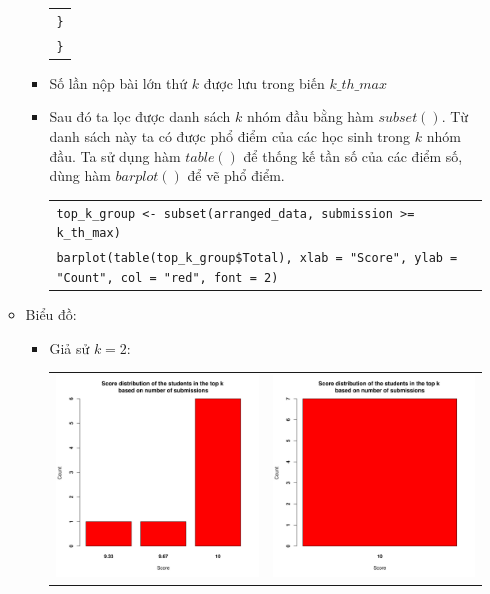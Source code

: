 \documentclass[a4paper]{article}
\theoremstyle{definition}
\begin{document}
\begin{enumerate}[a)]
\begin{itemize}
\begin{itemize}
\begin{center}
\begin{tabular}{p{13cm}}
                    \hspace{0.5cm} \texttt{\}} \\
                    \texttt{\}}
                \end{tabular}
            \end{center}
            \item Số lần nộp bài lớn thứ $k$ được lưu trong biến $k\_th\_max$
            \item Sau đó ta lọc được danh sách $k$ nhóm đầu bằng hàm $subset()$. Từ danh sách này ta có được phổ điểm của các học sinh trong $k$ nhóm đầu. Ta sử dụng hàm $table()$ để thống kế tần số của các điểm số, dùng hàm $barplot()$ để vẽ phổ điểm.\\
            \begin{center}
                \begin{tabular}{p{13cm}}
                    \texttt{top\_k\_group <- subset(arranged\_data, submission >= k\_th\_max)}\\
                    \texttt{barplot(table(top\_k\_group\$Total), xlab = "Score", ylab = "Count", col = "red", font = 2)}
                \end{tabular}
            \end{center}
        \end{itemize}
        \item Biểu đồ:
        \begin{itemize}
            \item Giả sử $k=2$:
            \begin{center}
                \begin{tabular}{c c}
                     \includegraphics[width = 6.9cm]{Images/img3-6-1.png} & 
                     \includegraphics[width = 6.9cm]{Images/img3-6-2.png} \\

\end{tabular}
\end{center}
\end{itemize}
\end{itemize}
\end{enumerate}
\end{document}
